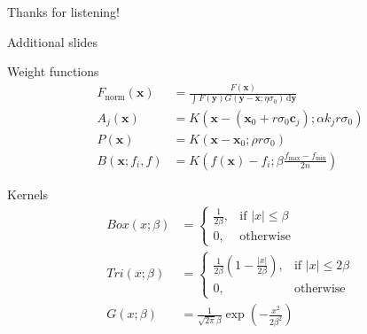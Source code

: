 \documentclass[14pt,t]{beamer}
\def\x{\mathbf{x}}
\def\y{\mathbf{y}}
\def\c{\mathbf{c}}
\begin{document}
%
\begin{frame}[c]
\begin{center}
\begin{huge}
Thanks for listening!
\end{huge}
\end{center}
\end{frame}
%
\appendix
\begin{frame}{Additional slides}
\ghostframe
\end{frame}
\begin{frame}{Weight functions}
\ghostframe
\setlength{\jot}{15pt}
\begin{align*}
F_\text{norm}(\x) &= \frac{F(\x)}{\int F(\y) G(\y - \x; \eta \sigma_0) \,\text{d} \y} \\
A_j(\x) &= K(\x - (\x_0 + r \sigma_0 \c_j); \alpha k_j r \sigma_0) \\
P(\x) &= K(\x - \x_0; \rho r \sigma_0) \\
B(\x; f_i, f) &= K \left( f(\x) - f_i; \beta \frac{f_\text{max} - f_\text{min}}{2n} \right)
\end{align*}
\end{frame}
%
\begin{frame}{Kernels}
\ghostframe
\setlength{\jot}{15pt}
\begin{align*}
\mathit{Box} (x; \beta) &= 
\begin{cases}
    \frac{1}{2 \beta},& \text{if } |x| \leq \beta \\
    0,              & \text{otherwise}
\end{cases} \\
\mathit{Tri} (x; \beta) &= 
\begin{cases}
    \frac{1}{2 \beta} \left( 1 - \frac{| x |}{2 \beta} \right) ,& \text{if } |x| \leq 2 \beta \\
    0,              & \text{otherwise}
\end{cases} \\
G(x;\beta) &= \frac{1}{\sqrt{2\pi} \beta}
\exp\left( -\frac{x^2}{2 \beta^2} \right)
\end{align*}
\end{frame}
%
\end{document}

